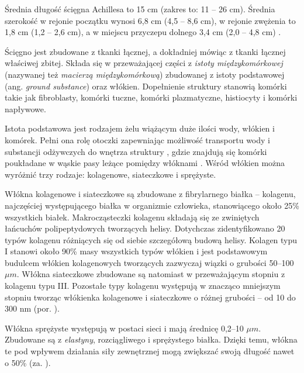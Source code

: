 Średnia długość ścięgna Achillesa to 15 cm (zakres to: 11 -- 26 cm). Średnia szerokość w rejonie początku wynosi 6,8 cm (4,5 -- 8,6 cm), w rejonie zwężenia \linebreak to 1,8 cm (1,2 -- 2,6 cm), a w miejscu przyczepu dolnego 3,4 cm (2,0 -- 4,8 cm) \cite{Doral2010, KoivunenNiemel1995}.

Ścięgno jest zbudowane z tkanki łącznej, a dokładniej mówiąc z tkanki łącznej właściwej zbitej. Składa się w przeważającej części z \textit{istoty międzykomórkowej} (nazywanej też \textit{macierzą międzykomórkową}) zbudowanej z istoty podstawowej (ang. \textit{ground substance}) oraz włókien. Dopełnienie struktury stanowią komórki takie jak fibroblasty, komórki tuczne, komórki plazmatyczne, histiocyty i komórki napływowe. 

Istota podstawowa jest rodzajem żelu wiążącym duże ilości wody, włókien i komórek. Pełni ona rolę otoczki zapewniając możliwość transportu wody i substancji odżywczych do wnętrza struktury \cite{Sharma2006}, gdzie znajdują się komórki poukładane \linebreak w wąskie pasy leżące pomiędzy włóknami \cite{Maffulli2005}. Wśród włókien można wyróżnić trzy rodzaje: kolagenowe, siateczkowe i sprężyste.

Włókna kolagenowe i siateczkowe są zbudowane z fibrylarnego białka -- kolagenu, najczęściej występującego białka w organizmie człowieka, stanowiącego około 25\% wszystkich białek. Makrocząsteczki kolagenu składają się ze zwiniętych łańcuchów polipeptydowych tworzących helisy. Dotychczas zidentyfikowano 20 typów kolagenu różniących się od siebie szczegółową budową helisy. Kolagen typu I stanowi około 90\% masy wszystkich typów włókien i jest podstawowym budulcem włókien kolagenowych tworzących zazwyczaj wiązki o grubości 50--100 $\mu$$m$. Włókna siateczkowe zbudowane są natomiast w przeważającym stopniu z kolagenu typu III. Pozostałe typy kolagenu występują w znacząco mniejszym stopniu tworząc włókienka kolagenowe i siateczkowe o różnej grubości -- od 10 do 300 nm (por. \cite{sawicki2008histologia}).

Włókna sprężyste występują w postaci sieci i mają średnicę 0,2--10 $\mu$$m$. Zbudowane są z \textit{elastyny}, rozciągliwego i sprężystego białka. Dzięki temu, włókna te pod wpływem działania siły zewnętrznej mogą zwiększać swoją długość nawet o 50\% (za. \cite{sawicki2008histologia}). 

